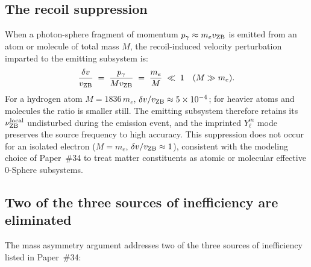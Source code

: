 \documentclass[%
 reprint, amsmath,amssymb, aps, prb, ]{revtex4-2}
\numberwithin{equation}{section}
\newcommand{\nuZBl}{\nu_{\text{ZB}}^{\rm local}}
\begin{document}
\subsection{The recoil suppression}

When a photon-sphere fragment of momentum $p_\gamma \approx m_e v_{\rm ZB}$ is emitted from an atom or molecule of total mass $M$, the recoil-induced velocity perturbation~\cite{mossbauer1958} imparted to the emitting subsystem is:
\begin{equation}
\frac{\delta v}{v_{\rm ZB}} \;=\; \frac{p_\gamma}{M v_{\rm ZB}} \;=\; \frac{m_e}{M} \;\ll\; 1
\quad (M \gg m_e).
\label{eq:recoil}
\end{equation}
For a hydrogen atom $M = 1836\,m_e$, $\delta v / v_{\rm ZB} \approx 5\times 10^{-4}$; for heavier atoms and molecules the ratio is smaller still. The emitting subsystem therefore retains its $\nuZBl$ undisturbed during the emission event, and the imprinted $Y_\ell^m$ mode preserves the source frequency to high accuracy. This suppression does not occur for an isolated electron ($M = m_e$, $\delta v/v_{\rm ZB} \approx 1$), consistent with the modeling choice of Paper~\#34 to treat matter constituents as atomic or molecular effective 0-Sphere subsystems.

\subsection{Two of the three sources of inefficiency are eliminated}

The mass asymmetry argument addresses two of the three sources of inefficiency listed in Paper~\#34:
\end{document}
